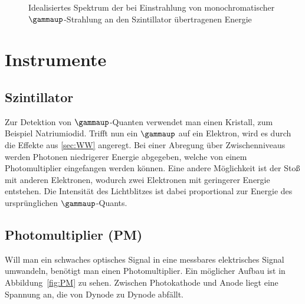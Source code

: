 \begin{figure}[htbp]
    \centering
    \caption{%
        Idealisiertes Spektrum der bei Einstrahlung von monochromatischer
        $\gammaup$-Strahlung an den Szintillator übertragenen Energie
    }
    \label{fig:Compton}
\end{figure}


\section{Instrumente}

\subsection{Szintillator}

Zur Detektion von $\gammaup$-Quanten verwendet man einen Kristall, zum Beispiel
Natriumiodid. Trifft nun ein $\gammaup$ auf ein Elektron, wird es durch die
Effekte aus \ref{sec:WW} angeregt. Bei einer Abregung über Zwischenniveaus
werden Photonen niedrigerer Energie abgegeben, welche von einem
Photomultiplier eingefangen werden können. Eine andere Möglichkeit ist der
Stoß mit anderen Elektronen, wodurch zwei Elektronen mit geringerer Energie
entstehen. Die Intensität des Lichtblitzes ist dabei proportional zur Energie
des ursprünglichen $\gammaup$-Quants.

\subsection{Photomultiplier (PM)}

Will man ein schwaches optisches Signal in eine messbares elektrisches Signal
umwandeln, benötigt man einen Photomultiplier. Ein möglicher Aufbau ist in
Abbildung~\ref{fig:PM} zu sehen. Zwischen Photokathode und Anode liegt eine
Spannung an, die von Dynode zu Dynode abfällt.

